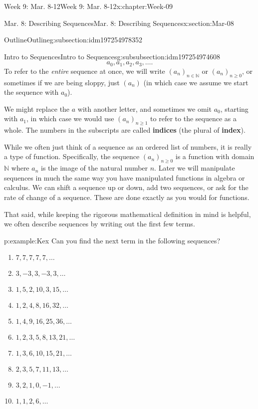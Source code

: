 \documentclass[oneside,10pt,]{book}
\newcommand{\terminology}[1]{\textbf{#1}}
\numberwithin{equation}{section}
\renewcommand{\ge}{\geqslant}
\def\N{{\mathbb N}}
\newcommand{\N}{\mathbb N}
\begin{document}
\begin{chapterptx}{Week 9: Mar. 8-12}{}{Week 9: Mar. 8-12}{}{}{x:chapter:Week-09}
\begin{sectionptx}{Mar. 8: Describing Sequences}{}{Mar. 8: Describing Sequences}{}{}{x:section:Mar-08}
\begin{subsectionptx}{Outline}{}{Outline}{}{}{g:subsection:idm197254978352}
\begin{subsubsectionptx}{Intro to Sequences}{}{Intro to Sequences}{}{}{g:subsubsection:idm197254974608}
\begin{equation*}
a_0, a_1, a_2, a_3, \ldots\text{.}
\end{equation*}
To refer to the \emph{entire} sequence at once, we will write \((a_n)_{n\in\N}\) or \((a_n)_{n\ge 0}\), or sometimes if we are being sloppy, just \((a_n)\) (in which case we assume we start the sequence with \(a_0\)). \label{g:notation:idm197254967264}%
\par
We might replace the \(a\) with another letter, and sometimes we omit \(a_0\), starting with \(a_1\), in which case we would use \((a_n)_{n \ge 1}\) to refer to the sequence as a whole. The numbers in the subscripts are called \terminology{indices} (the plural of \terminology{index}).%
\par
{} While we often just think of a sequence as an ordered list of numbers, it is really a type of function. Specifically, the sequence \((a_n)_{n\ge 0}\) is a function with domain \(\N\) where \(a_n\) is the image of the natural number \(n\). Later we will manipulate sequences in much the same way you have manipulated functions in algebra or calculus. We can shift a sequence up or down, add two sequences, or ask for the rate of change of a sequence. These are done exactly as you would for functions.%
\par
That said, while keeping the rigorous mathematical definition in mind is helpful, we often describe sequences by writing out the first few terms.%
\begin{example}{}{p:example:Kex}%
Can you find the next term in the following sequences?%
\par
%
\begin{enumerate}
\item{}\(\displaystyle 7,7,7,7,7, \ldots\)%
\item{}\(\displaystyle 3, -3, 3, -3, 3, \ldots\)%
\item{}\(\displaystyle 1, 5, 2, 10, 3, 15, \ldots\)%
\item{}\(\displaystyle 1, 2, 4, 8, 16, 32, \ldots\)%
\item{}\(\displaystyle 1, 4, 9, 16, 25, 36, \ldots\)%
\item{}\(\displaystyle 1, 2, 3, 5, 8, 13, 21, \ldots\)%
\item{}\(\displaystyle 1, 3, 6, 10, 15, 21, \ldots\)%
\item{}\(\displaystyle 2, 3, 5, 7, 11, 13, \ldots\)%
\item{}\(\displaystyle 3, 2, 1, 0, -1, \ldots\)%
\item{}\(\displaystyle 1, 1, 2, 6, \ldots\)%

\end{enumerate}
\end{example}
\end{subsubsectionptx}
\end{subsectionptx}
\end{sectionptx}
\end{chapterptx}
\end{document}
